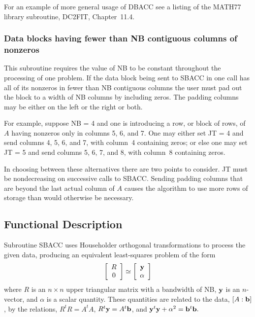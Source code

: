 \documentclass[twoside]{MATH77}
\begin{document}
For an example of more general usage of DBACC see a listing of the MATH77
library subroutine, DC2FIT, Chapter~11.4.

\subsubsection{Data blocks having fewer than NB contiguous columns of nonzeros}

This subroutine requires the value of NB to be constant throughout the
processing of one problem. If the data block being sent to SBACC in one call
has all of its nonzeros in fewer than NB contiguous columns the user must
pad out the block to a width of NB columns by including zeros. The padding
columns may be either on the left or the right or both.

For example, suppose NB = 4 and one is introducing a row, or block of rows,
of $A$ having nonzeros only in columns 5, 6, and 7. One may either set JT =
4 and send columns 4, 5, 6, and 7, with column~4 containing zeros; or else
one may set JT = 5 and send columns 5, 6, 7, and 8, with column~8 containing
zeros.

In choosing between these alternatives there are two points to consider. JT
must be nondecreasing on successive calls to SBACC. Sending padding columns
that are beyond the last actual column of $A$ causes the algorithm to use
more rows of storage than would otherwise be necessary.

\subsection{Functional Description}

Subroutine SBACC uses Householder orthogonal transformations to process the
given data, producing an equivalent least-squares problem of the form%
\begin{equation*}
\left[
\begin{array}{c}
R \\
0
\end{array}
\right] \simeq \left[
\begin{array}{c}
{\bf y} \\ \alpha
\end{array}
\right]
\end{equation*}
where $R$ is an $n\times n$ upper triangular matrix with a bandwidth of NB, $%
{\bf y}$ is an $n$-vector, and $\alpha $ is a scalar quantity. These
quantities are related to the data, $[A:{\bf b}]$, by the relations, $%
R^tR=A^tA$, $R^t{\bf y}=A^t{\bf b}$, and ${\bf y}^t{\bf y}+\alpha ^2={\bf b}%
^t{\bf b}.$
\end{document}

